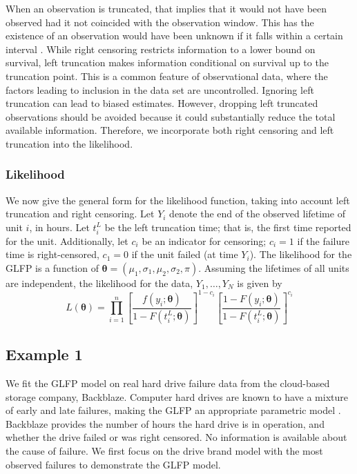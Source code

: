 \documentclass[12pt]{article}
\begin{document}
When an observation is truncated, that implies that it would not have been observed had it not coincided with the observation window. This has the existence of an observation would have been unknown if it falls within a certain interval \cite{meeker}. While right censoring restricts information to a lower bound on survival, left truncation makes information conditional on survival up to the truncation point. This is a common feature of observational data, where the factors leading to inclusion in the data set are uncontrolled. Ignoring left truncation can lead to biased estimates. However, dropping left truncated observations should be avoided because it could substantially reduce the total available information.  Therefore, we incorporate both right censoring and left truncation into the likelihood. 

\subsubsection{Likelihood}
We now give the general form for the likelihood function, taking into account left truncation and right censoring.  Let $Y_{i}$ denote the end of the observed lifetime of unit $i$, in hours.  Let $t_i^L$ be the left truncation time; that is, the first time reported for the unit.  Additionally, let $c_i$ be an indicator for censoring; $c_i=1$ if the failure time is right-censored, $c_1=0$ if the unit failed (at time $Y_i$). The likelihood for the GLFP is a function of $\bm{\theta} = (\mu_1, \sigma_1, \mu_2, \sigma_2, \pi)$.  Assuming the lifetimes of all units are independent, the likelihood for the data, $Y_1,\ldots,Y_N$ is given by
\begin{equation*}
L(\bm{\theta})= \prod_{i=1}^{n} \left[\frac{f(y_i;\bm{\theta})}{1-F(t_i^L;\bm{\theta})}\right]^{1-c_i} \left[ \frac{1-F(y_i;\bm{\theta})}{1-F(t_i^L;\bm{\theta})} \right]^{c_i}
\end{equation*}

\subsection{Example 1}
We fit the GLFP model on real hard drive failure data from the cloud-based storage company, Backblaze.  Computer hard drives are known to have a mixture of early and late failures, making the GLFP an appropriate parametric model \cite{chan}.  Backblaze provides the number of hours the hard drive is in operation, and whether the drive failed or was right censored.  No information is available about the cause of failure.  We first focus on the drive brand model with the most observed failures to demonstrate the GLFP model.  \\
\end{document}

